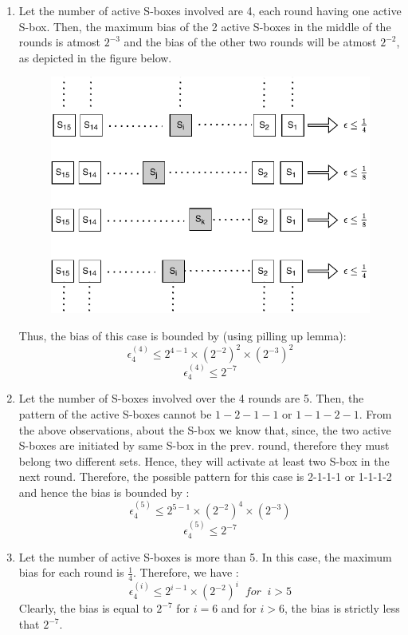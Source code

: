 \documentclass[journal=tosc,preprint]{iacrtrans}
\begin{document}
\begin{enumerate}
	\item Let the number of active S-boxes involved are 4, each round having one active S-box. Then, the maximum bias of the 2 active S-boxes in the middle of the rounds is atmost $2^{-3}$ and the bias of the other two rounds will be atmost $2^{-2}$, as depicted in the figure below.

    \begin{figure}[h!]
	\centering
	\includegraphics[width=0.7\linewidth, height=0.4\textheight]{LC}
	\caption{}
	\label{fig:lc}
    \end{figure}
Thus, the bias of this case is bounded by (using pilling up lemma): 
	\begin{equation*}
	\epsilon_4^{(4)} \leq 2^{4-1} \times (2^{-2})^2 \times (2^{-3})^2
	\end{equation*}
	\begin{equation*}
	\epsilon_4^{(4)} \leq 2^{-7} 
	\end{equation*}
	\item Let the number of S-boxes involved over the 4 rounds are 5. Then, the pattern of the active S-boxes cannot be $1-2-1-1$ or $1-1-2-1$. From the above observations, about the S-box we know that, since, the two active S-boxes are initiated by same S-box in the prev. round, therefore they must belong two different sets. Hence, they will activate at least two S-box in the next round. Therefore, the possible pattern for this case is 2-1-1-1 or 1-1-1-2 and hence the bias is bounded by : 
	\begin{equation*}
	\epsilon_4^{(5)} \leq 2^{5-1} \times (2^{-2})^4 \times (2^{-3})
	\end{equation*}
	\begin{equation*}
	\epsilon_4^{(5)} \leq 2^{-7} 
	\end{equation*}
	\item Let the number of active S-boxes is more than 5. In this case, the maximum bias for each round is $\frac{1}{4}$. Therefore, we have : 
	\begin{equation*}
	\epsilon_4^{(i)} \leq 2^{i-1} \times (2^{-2})^i \;\; for \;\; i > 5
	\end{equation*}
	Clearly, the bias is equal to $2^{-7}$ for $i = 6$ and for $i > 6$, the bias is strictly less that $2^{-7}$. 
\end{enumerate}
\end{document}
